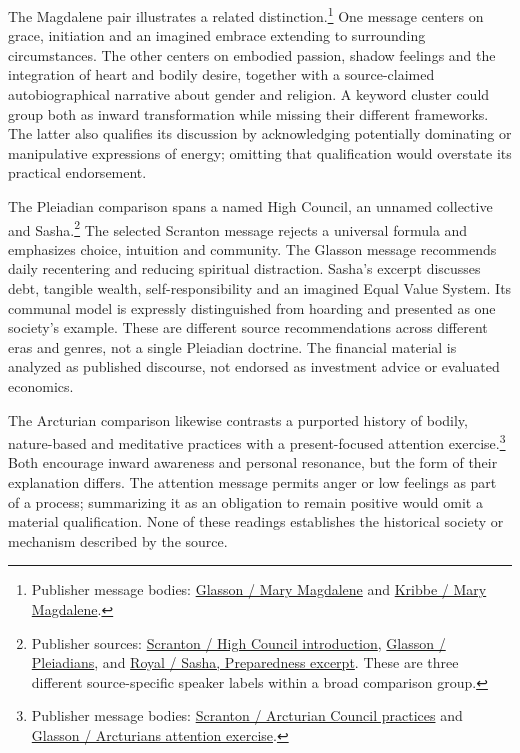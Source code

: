 \documentclass[
  11pt,
]{article}
\begin{document}
The Magdalene pair illustrates a related distinction.\footnote{Publisher
  message bodies:
  \href{https://omna.org/grace-embrace-initiation-by-mary-magdalene/}{Glasson
  / Mary Magdalene} and
  \href{https://www.jeshua.net/channelings/mary-magdalene/the-fire-in-your-belly/}{Kribbe
  / Mary Magdalene}.} One message centers on grace, initiation and an
imagined embrace extending to surrounding circumstances. The other
centers on embodied passion, shadow feelings and the integration of
heart and bodily desire, together with a source-claimed autobiographical
narrative about gender and religion. A keyword cluster could group both
as inward transformation while missing their different frameworks. The
latter also qualifies its discussion by acknowledging potentially
dominating or manipulative expressions of energy; omitting that
qualification would overstate its practical endorsement.

The Pleiadian comparison spans a named High Council, an unnamed
collective and Sasha.\footnote{Publisher sources:
  \href{https://danielscranton.com/introductions-pleiadian-high-council/}{Scranton
  / High Council introduction},
  \href{https://omna.org/recentering-your-ascension-by-pleiadians/}{Glasson
  / Pleiadians}, and
  \href{https://www.lyssaroyal.net/uploads/1/5/7/1/15716170/tran-preparedness138.pdf}{Royal
  / Sasha, Preparedness excerpt}. These are three different
  source-specific speaker labels within a broad comparison group.} The
selected Scranton message rejects a universal formula and emphasizes
choice, intuition and community. The Glasson message recommends daily
recentering and reducing spiritual distraction. Sasha's excerpt
discusses debt, tangible wealth, self-responsibility and an imagined
Equal Value System. Its communal model is expressly distinguished from
hoarding and presented as one society's example. These are different
source recommendations across different eras and genres, not a single
Pleiadian doctrine. The financial material is analyzed as published
discourse, not endorsed as investment advice or evaluated economics.

The Arcturian comparison likewise contrasts a purported history of
bodily, nature-based and meditative practices with a present-focused
attention exercise.\footnote{Publisher message bodies:
  \href{https://danielscranton.com/ancient-arcturian-practices-\%e2\%88\%9ethe-9d-arcturian-council/}{Scranton
  / Arcturian Council practices} and
  \href{https://omna.org/as-you-focus-so-you-become-by-the-arcturians/}{Glasson
  / Arcturians attention exercise}.} Both encourage inward awareness and
personal resonance, but the form of their explanation differs. The
attention message permits anger or low feelings as part of a process;
summarizing it as an obligation to remain positive would omit a material
qualification. None of these readings establishes the historical society
or mechanism described by the source.
\end{document}
